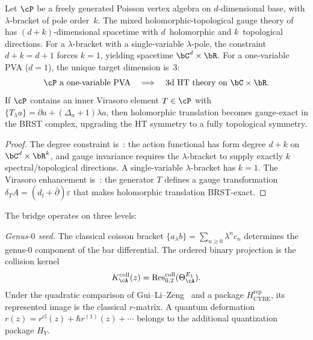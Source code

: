\begin{proposition}
\label{prop:pva-degree-constraint}
Let $\cP$ be a freely generated Poisson vertex algebra
on $d$-dimensional base, with $\lambda$-bracket of pole order~$k$.
The mixed holomorphic-topological gauge theory of\/
\textup{\cite{KhanZeng25}} has $(d+k)$-dimensional spacetime with
$d$~holomorphic and $k$~topological directions. For a
$\lambda$-bracket with a single-variable $\lambda$-pole,
the constraint $d + k = d + 1$ forces $k = 1$, yielding spacetime
$\bC^d \times \bR$. For a one-variable PVA \textup{(}$d=1$\textup{)},
the unique target dimension is~$3$:
\[
 \cP \text{ a one-variable PVA}
 \quad\Longrightarrow\quad
 \text{3d HT theory on } \bC \times \bR.
\]
If $\cP$ contains an inner Virasoro element
$T \in \cP$ with $\{T_\lambda a\} = \partial a + (\Delta_a+1)\lambda a$,
then holomorphic translation becomes gauge-exact in the
BRST complex, upgrading the $\mathrm{HT}$ symmetry to a fully
topological symmetry.
\end{proposition}

\begin{proof}
The degree constraint is~\cite[\S\,2.2, equation~(2.24)]{KhanZeng25}:
the action functional has form degree $d + k$ on
$\bC^d \times \bR^k$, and gauge invariance requires the
$\lambda$-bracket to supply exactly $k$ spectral/topological
directions. A single-variable $\lambda$-bracket has $k = 1$.
The Virasoro enhancement
is~\cite[\S\,4.3]{KhanZeng25}: the generator $T$ defines a
gauge transformation $\delta_T A = (d_t + \bar\partial)\varepsilon$
that makes holomorphic translation BRST-exact.
\end{proof}

The bridge operates on three levels:

\emph{Genus-$0$ seed.}
The classical coisson bracket
$\{a_\lambda b\}=\sum_{n\ge 0}\lambda^n c_n$
determines the genus-$0$ component of the bar differential.
The ordered binary projection is the collision kernel
\[
K_\cA^{\mathrm{coll}}(z)
=\operatorname{Res}^{\mathrm{coll}}_{0,2}(\Theta_\cA^{E_1}).
\]
Under the quadratic comparison of Gui--Li--Zeng~\cite{GLZ22} and a
package $H_{\mathrm{CYBE}}^{\mathrm{rep}}$, its represented image is
the classical $r$-matrix.  A quantum deformation
$r(z)=r^{\mathrm{cl}}(z)+\hbar r^{(1)}(z)+\cdots$ belongs to the
additional quantization package $H_Y$.

